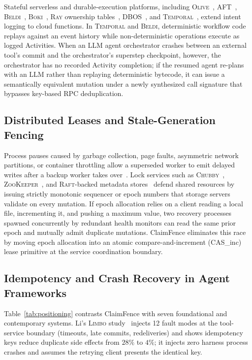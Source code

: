 \documentclass[10pt,journal]{IEEEtran}
\def\CF{ClaimFence}%
\def\texttt#1{#1}%
\theoremstyle{definition}
\theoremstyle{remark}
\newcommand{\CF}{\textsc{ClaimFence}}
\begin{document}
Stateful serverless and durable-execution platforms, including \textsc{Olive}~\cite{setty2016olive}, \textsc{AFT}~\cite{sreekanti2020aft}, \textsc{Beldi}~\cite{zhang2020beldi}, \textsc{Boki}~\cite{jia2021boki}, \textsc{Ray} ownership tables~\cite{wang2021ownership}, \textsc{DBOS}~\cite{li2023dbos}, and \textsc{Temporal}~\cite{temporal2024}, extend intent logging to cloud functions. In \textsc{Temporal} and \textsc{Beldi}, deterministic workflow code replays against an event history while non-deterministic operations execute as logged Activities. When an LLM agent orchestrator crashes between an external tool's commit and the orchestrator's superstep checkpoint, however, the orchestrator has no recorded Activity completion; if the resumed agent re-plans with an LLM rather than replaying deterministic bytecode, it can issue a semantically equivalent mutation under a newly synthesized call signature that bypasses key-based RPC deduplication.

\subsection{Distributed Leases and Stale-Generation Fencing}
Process pauses caused by garbage collection, page faults, asymmetric network partitions, or container throttling allow a superseded worker to emit delayed writes after a backup worker takes over~\cite{gray1989leases,kleppmann2017ddia}. Lock services such as \textsc{Chubby}~\cite{burrows2006chubby}, \textsc{ZooKeeper}~\cite{hunt2010zookeeper}, and \textsc{Raft}-backed metadata stores~\cite{ongaro2014raft} defend shared resources by issuing strictly monotonic sequencer or epoch numbers that storage servers validate on every mutation. If epoch allocation relies on a client reading a local file, incrementing it, and pushing a maximum value, two recovery processes spawned concurrently by redundant health monitors can read the same prior epoch and mutually admit duplicate mutations. \CF{} eliminates this race by moving epoch allocation into an atomic compare-and-increment (\texttt{CAS\_inc}) lease primitive at the service coordination boundary.

\subsection{Idempotency and Crash Recovery in Agent Frameworks}
Table~\ref{tab:positioning} contrasts \CF{} with seven foundational and contemporary systems. Li's \textsc{Limbo} study~\cite{limbo2026} injects 12 fault modes at the tool-service boundary (timeouts, late commits, redeliveries) and shows idempotency keys reduce duplicate side effects from $28\%$ to $4\%$; it injects zero harness process crashes and assumes the retrying client presents the identical key.
\end{document}
